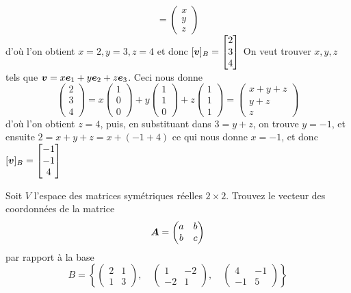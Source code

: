 \begin{exemple}
\[=
\begin{pmatrix}
x\\y\\z
\end{pmatrix}
\]
d'où l'on obtient $x=2, y=3, z=4$ et donc $\displaystyle [\boldsymbol{v}]_B = \begin{bmatrix}
2\\3\\4
\end{bmatrix}
$
  On veut trouver $x, y, z$ tels que $\boldsymbol{v} = x\boldsymbol{e}_1 + y\boldsymbol{e}_2 + z\boldsymbol{e}_3$.  Ceci nous
donne
\[
\begin{pmatrix}
2\\
3\\
4
\end{pmatrix}
=
x\begin{pmatrix}
1\\0\\0
\end{pmatrix}
+ 
y\begin{pmatrix}
1\\1\\0
\end{pmatrix}
+ z \begin{pmatrix}
1 \\1\\1
\end{pmatrix}
=
\begin{pmatrix}
x+y+z\\y+z\\z
\end{pmatrix}
\]
d'où l'on obtient $z=4$, puis, en substituant dans $3=y+z$, on trouve $y=-1$, et ensuite $2=x+y+z = x + (-1+4)$ ce qui nous
donne $x=-1$, et donc
$\displaystyle
[\boldsymbol{v}]_B = \begin{bmatrix}
-1\\-1\\4
\end{bmatrix}
$
\end{exemple}
\begin{exerciceC}
Soit $V$ l'espace des matrices symétriques réelles $2\times2$. Trouvez le vecteur des coordonnées
de la matrice
\[
\boldsymbol{A} = \begin{pmatrix}
a & b\\
b & c
\end{pmatrix}
\]
par rapport à la base
\[
B = \left\{     
\begin{pmatrix}
2 & 1 \\
1 & 3
\end{pmatrix}, \quad
\begin{pmatrix}
1 & -2 \\
-2 & 1
\end{pmatrix}, \quad
\begin{pmatrix}
4 & -1 \\
-1 & 5
\end{pmatrix}
\right\}
\]
\end{exerciceC}
